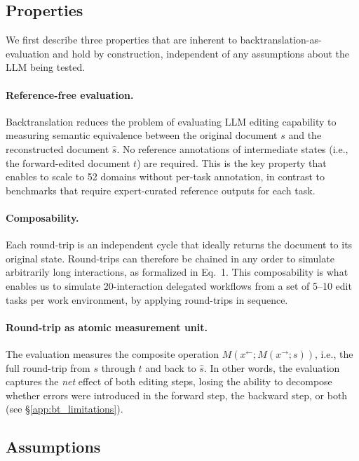 \documentclass{article} %
\begin{document}
\subsection{Properties} \label{app:bt_properties}

We first describe three properties that are inherent to backtranslation-as-evaluation and hold by construction, independent of any assumptions about the LLM being tested.

\paragraph{Reference-free evaluation.} Backtranslation reduces the problem of evaluating LLM editing capability to measuring semantic equivalence between the original document $s$ and the reconstructed document $\hat{s}$. No reference annotations of intermediate states (i.e., the forward-edited document $t$) are required. This is the key property that enables \benchmark{} to scale to 52 domains without per-task annotation, in contrast to benchmarks that require expert-curated reference outputs for each task.

\paragraph{Composability.} Each round-trip is an independent cycle that ideally returns the document to its original state. Round-trips can therefore be chained in any order to simulate arbitrarily long interactions, as formalized in Eq.~1. This composability is what enables us to simulate 20-interaction delegated workflows from a set of 5--10 edit tasks per work environment, by applying round-trips in sequence.

\paragraph{Round-trip as atomic measurement unit.} The evaluation measures the composite operation $M(x^{\leftarrow}; M(x^{\rightarrow}; s))$, i.e., the full round-trip from $s$ through $t$ and back to $\hat{s}$. In other words, the evaluation captures the \textit{net} effect of both editing steps, losing the ability to decompose whether errors were introduced in the forward step, the backward step, or both (see \S\ref{app:bt_limitations}).

\subsection{Assumptions} \label{app:bt_assumptions}
\end{document}
